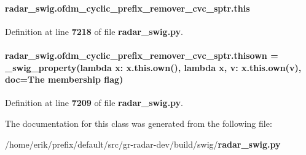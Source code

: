 \paragraph[{this}]{\setlength{\rightskip}{0pt plus 5cm}radar\+\_\+swig.\+ofdm\+\_\+cyclic\+\_\+prefix\+\_\+remover\+\_\+cvc\+\_\+sptr.\+this}\label{classradar__swig_1_1ofdm__cyclic__prefix__remover__cvc__sptr_aebb41c3498f9050ff274ce4419a22ee7}


Definition at line {\bf 7218} of file {\bf radar\+\_\+swig.\+py}.

\paragraph[{thisown}]{\setlength{\rightskip}{0pt plus 5cm}radar\+\_\+swig.\+ofdm\+\_\+cyclic\+\_\+prefix\+\_\+remover\+\_\+cvc\+\_\+sptr.\+thisown = {\bf \+\_\+swig\+\_\+property}(lambda x\+: x.\+this.\+own(), lambda {\bf x}, v\+: x.\+this.\+own(v), doc=\textquotesingle{}The membership flag\textquotesingle{})\hspace{0.3cm}{\ttfamily [static]}}\label{classradar__swig_1_1ofdm__cyclic__prefix__remover__cvc__sptr_a2f9f53bffe4908ef30b1c7318e9938c3}


Definition at line {\bf 7209} of file {\bf radar\+\_\+swig.\+py}.



The documentation for this class was generated from the following file\+:\begin{DoxyCompactItemize}
\item 
/home/erik/prefix/default/src/gr-\/radar-\/dev/build/swig/{\bf radar\+\_\+swig.\+py}\end{DoxyCompactItemize}
